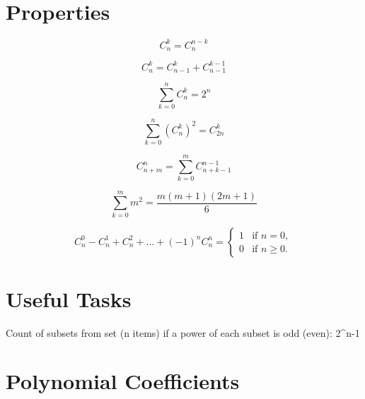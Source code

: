 \documentclass{exam}
\theoremstyle{definition}
\begin{document}
    \section{Properties} \label{sec:Properties}

    \begin{equation}
        C^k_n = C^{n-k}_n
    \end{equation}

    \begin{equation}
        C^k_{n} = C^k_{n-1} + C^{k-1}_{n-1}
    \end{equation}

    \begin{equation}
        \sum_{k=0}^n C^k_n = 2^n
    \end{equation}

    \begin{equation}
        \sum_{k=0}^n (C^k_{n})^2 = C^k_{2n}
    \end{equation}

    \begin{equation}
        C^n_{n+m} = \sum_{k=0}^m C^{n-1}_{n+k-1}
    \end{equation}

    \begin{equation}
        \sum_{k=0}^m m^2 = \frac{m(m+1)(2m+1)}{6}
    \end{equation}

    \begin{equation}
        C^0_n - C^1_n + C^2_n + ... + (-1)^n C^n_n = \left\{
        \begin{array}{rl}
            1 & \text{if } n = 0,\\
            0 & \text{if } n \geq 0.
        \end{array} \right.
    \end{equation}

    \section{Useful Tasks} \label{sec:Useful Tasks}
    Count of subsets from set (n items) if a power of each subset is odd (even): 2^{n-1}

    \section{Polynomial Coefficients} \label{sec:Polynomial Coefficients}
\end{document}

